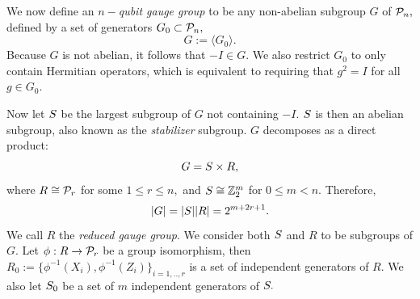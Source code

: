 We now define an {\it $n-$qubit gauge group} to be 
any non-abelian subgroup $G$ of $\mathcal{P}_n,$
defined by a set of generators $G_0\subset \mathcal{P}_n,$
$$ G := \langle G_0\rangle.$$
Because $G$ is not abelian, it follows that $-I\in G.$
We also restrict $G_0$ to only contain Hermitian operators,
which is equivalent to requiring that $g^2=I$ for all $g\in G_0.$

Now let $S$ be the largest subgroup of $G$ not containing
$-I.$
$S$ is then an abelian subgroup,
also known as the {\it stabilizer} subgroup.
$G$ decomposes as a direct product:
$$G = S\times R,$$
where $R\cong \mathcal{P}_r$ for some $1\le r\le n,$
and $S\cong \mathbb{Z}_2^{m}$ for $0\le m<n.$
Therefore, 
$$|G| = |S| |R| = 2^{m+2r+1}.$$
We call $R$ the {\it reduced gauge group}.
We consider both $S$ and $R$ to be subgroups of $G.$
Let $\phi:R\to \mathcal{P}_r$ be a group isomorphism,
then $R_0 := \{\phi^{-1}(X_i), \phi^{-1}(Z_i)\}_{i=1,..,r}$
is a set of independent generators of $R.$
We also let $S_0$ be a set of $m$ independent generators of $S.$

